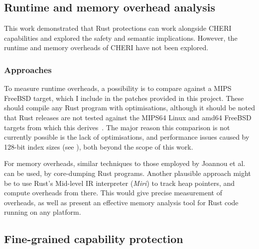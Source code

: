 \documentclass[dissertation.tex]{subfiles}
\begin{document}
\subsection{Runtime and memory overhead analysis}
This work demonstrated that Rust protections can work alongside CHERI
capabilities and explored the safety and semantic implications.
However, the runtime and memory overheads of CHERI have not been
explored.

\subsubsection{Approaches}
To measure runtime overheads, a possibility is to compare against a MIPS
FreeBSD target, which I include in the patches provided in this project.
These should compile any Rust program with optimisations, although it
should be noted that Rust releases are not tested against the MIPS64
Linux and amd64 FreeBSD targets from which this
derives~\cite{rust-platform-support}.
The major reason this comparison is not currently possible is the lack
of optimisations, and performance issues caused by 128-bit index sizes
(see ), both beyond the scope of this work.

For memory overheads, similar techniques to those employed by Joannou et
al.\ \cite{cheri-tagged-memory} can be used, by core-dumping Rust
programs.
Another plausible approach might be to use Rust's Mid-level IR
interpreter (\emph{Miri}) to track heap pointers, and compute overheads
from there.
This would give precise measurement of overheads, as well as present an
effective memory analysis tool for Rust code running on any platform.


\subsection{Fine-grained capability protection}
\end{document}
